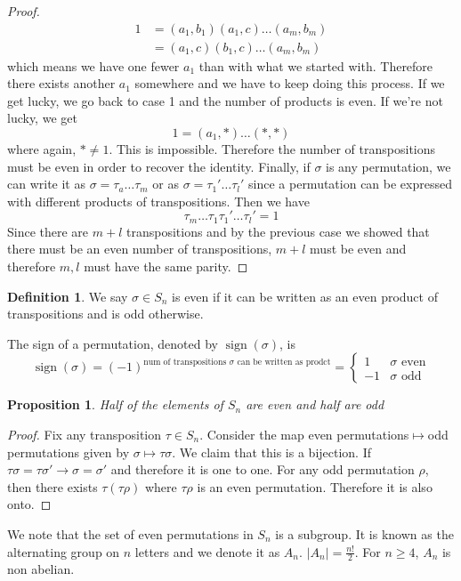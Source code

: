 \documentclass{article}
\newtheorem{proposition}[theorem]{Proposition}
\theoremstyle{definition}
\newtheorem{definition}[theorem]{Definition}
\begin{document}
\begin{proof}
\begin{equation*}
\begin{split}
            1&=(a_1,b_1)(a_1,c)\ldots(a_m,b_m)\\
            &=(a_1,c)(b_1,c)\ldots(a_m,b_m)
        \end{split}
    \end{equation*}
    which means we have one fewer $a_1$ than with what we started with. Therefore there exists another $a_1$ somewhere and we have to keep doing this process. If we get lucky, we go back to case 1 and the number of products is even. If we're not lucky, we get 
    \begin{equation*}
        1=(a_1,*)\ldots(*,*)
    \end{equation*}
    where again, $*\neq 1$. This is impossible. Therefore the number of transpositions must be even in order to recover the identity. Finally, if $\sigma$ is any permutation, we can write it as $\sigma =\tau_a\ldots\tau _m$ or as $\sigma=\tau_1'\ldots \tau_l'$ since a permutation can be expressed with different products of transpositions. Then we have 
    \begin{equation*}
        \tau_m\ldots \tau_1\tau_1'\ldots \tau_l'=1
    \end{equation*}
    Since there are $m+l$ transpositions and by the previous case we showed that there must be an even number of transpositions, $m+l$ must be even and therefore $m,l$ must have the same parity.
\end{proof}
\begin{definition}
    We say $\sigma \in S_n$ is even if it can be written as an even product of transpositions and is odd otherwise. 
\end{definition}
The sign of a permutation, denoted by $\operatorname{sign}(\sigma)$, is 
\begin{equation*}
    \operatorname{sign}(\sigma) = (-1)^{\text{num of transpositions }\sigma\text{ can be written as prodct}} =\begin{cases}
        1 & \sigma \text{ even} \\ -1 & \sigma \text{ odd}
    \end{cases}
\end{equation*}
\begin{proposition}
    Half of the elements of $S_n$ are even and half are odd
\end{proposition}
\begin{proof}
    Fix any transposition $\tau \in S_n$. Consider the map {even permutations}$\mapsto ${odd permutations} given by $\sigma \mapsto \tau \sigma$. We claim that this is a bijection. If $\tau \sigma = \tau \sigma ' \to \sigma = \sigma'$ and therefore it is one to one. For any odd permutation $\rho$, then there exists $\tau (\tau \rho)$ where $\tau \rho$ is an even permutation. Therefore it is also onto. 
\end{proof}
We note that the set of even permutations in $S_n$ is a subgroup. It is known as the alternating group on $n$ letters and we denote it as $A_n$. $|A_n| = \frac{n!}{2}$. For $n\geq 4$, $A_n$ is non abelian. 
\end{document}

